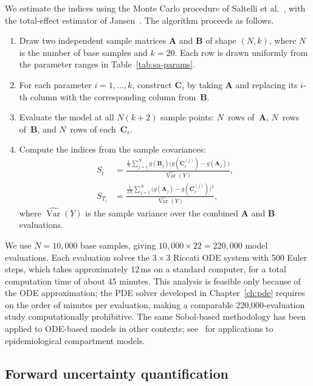 We estimate the indices using the Monte Carlo procedure of Saltelli et al.~\cite{saltelli2010}, with the total-effect estimator of Jansen~\cite{jansen1999}. The algorithm proceeds as follows.
\begin{enumerate}
  \item Draw two independent sample matrices $\mathbf{A}$ and $\mathbf{B}$ of shape $(N, k)$, where $N$ is the number of base samples and $k = 20$. Each row is drawn uniformly from the parameter ranges in Table~\ref{tab:sa-params}.
  \item For each parameter $i = 1, \ldots, k$, construct $\mathbf{C}_i$ by taking $\mathbf{A}$ and replacing its $i$-th column with the corresponding column from~$\mathbf{B}$.
  \item Evaluate the model at all $N(k+2)$ sample points: $N$~rows of~$\mathbf{A}$, $N$~rows of~$\mathbf{B}$, and $N$~rows of each~$\mathbf{C}_i$.
  \item Compute the indices from the sample covariances:
  \begin{align}
    \label{eq:sobol-estimators}
    S_i &= \frac{\frac{1}{N}\sum_{j=1}^{N} g(\mathbf{B}_j)\bigl(g(\mathbf{C}_i^{(j)}) - g(\mathbf{A}_j)\bigr)}{\widehat{\operatorname{Var}}(Y)}, \\[4pt]
    S_{T_i} &= \frac{\frac{1}{2N}\sum_{j=1}^{N}\bigl(g(\mathbf{A}_j) - g(\mathbf{C}_i^{(j)})\bigr)^2}{\widehat{\operatorname{Var}}(Y)},
  \end{align}
  where $\widehat{\operatorname{Var}}(Y)$ is the sample variance over the combined $\mathbf{A}$ and $\mathbf{B}$ evaluations.
\end{enumerate}

We use $N = 10{,}000$ base samples, giving $10{,}000 \times 22 = 220{,}000$ model evaluations. Each evaluation solves the $3 \times 3$ Riccati ODE system with 500 Euler steps, which takes approximately 12\,ms on a standard computer, for a total computation time of about 45 minutes. This analysis is feasible only because of the ODE approximation; the PDE solver developed in Chapter~\ref{ch:pde} requires on the order of minutes per evaluation, making a comparable 220{,}000-evaluation study computationally prohibitive. The same Sobol-based methodology has been applied to ODE-based models in other contexts; see~\cite{jakobsson2023, piazzola2021} for applications to epidemiological compartment models.


\subsection{Forward uncertainty quantification}
\label{sec:sa-forward-method}

